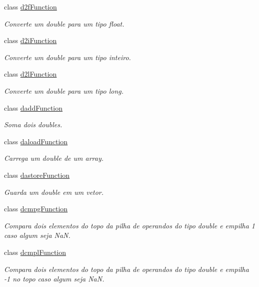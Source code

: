\begin{DoxyCompactItemize}
class \hyperlink{classInstruction_1_1d2fFunction}{d2f\+Function}
\begin{DoxyCompactList}\small\item\em Converte um double para um tipo float. \end{DoxyCompactList}\item 
class \hyperlink{classInstruction_1_1d2iFunction}{d2i\+Function}
\begin{DoxyCompactList}\small\item\em Converte um double para um tipo inteiro. \end{DoxyCompactList}\item 
class \hyperlink{classInstruction_1_1d2lFunction}{d2l\+Function}
\begin{DoxyCompactList}\small\item\em Converte um double para um tipo long. \end{DoxyCompactList}\item 
class \hyperlink{classInstruction_1_1daddFunction}{dadd\+Function}
\begin{DoxyCompactList}\small\item\em Soma dois doubles. \end{DoxyCompactList}\item 
class \hyperlink{classInstruction_1_1daloadFunction}{daload\+Function}
\begin{DoxyCompactList}\small\item\em Carrega um double de um array. \end{DoxyCompactList}\item 
class \hyperlink{classInstruction_1_1dastoreFunction}{dastore\+Function}
\begin{DoxyCompactList}\small\item\em Guarda um double em um vetor. \end{DoxyCompactList}\item 
class \hyperlink{classInstruction_1_1dcmpgFunction}{dcmpg\+Function}
\begin{DoxyCompactList}\small\item\em Compara dois elementos do topo da pilha de operandos do tipo double e empilha 1 caso algum seja NaN. \end{DoxyCompactList}\item 
class \hyperlink{classInstruction_1_1dcmplFunction}{dcmpl\+Function}
\begin{DoxyCompactList}\small\item\em Compara dois elementos do topo da pilha de operandos do tipo double e empilha -\/1 no topo caso algum seja NaN. \end{DoxyCompactList}\item 

\end{DoxyCompactItemize}
